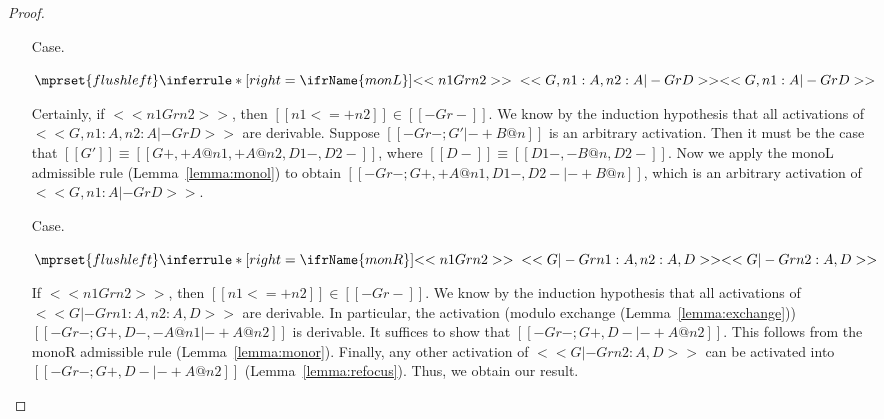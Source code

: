 \begin{proof}
\begin{itemize}
  \item[Case.]\ \\ 
    \begin{center}
      \begin{math}
        $$\mprset{flushleft}
        \inferrule* [right=\ifrName{monL}] {
          <<n1 Gr n2>>
          \\\\
          <<G , n1 : A , n2 : A |- Gr D>>
        }{<<G , n1 : A |- Gr D>>}
      \end{math}
    \end{center}
    Certainly, if $<<n1 Gr n2>>$, then $[[n1 <=+ n2]] \in [[-Gr-]]$.
    We know by the induction hypothesis that all activations of $<<G , n1 : A , n2 : A |- Gr D>>$ are
    derivable.  Suppose $[[-Gr- ; G' |- + B @ n]]$ is an arbitrary activation.  Then it must be the case
    that $[[G']] \equiv [[{G}+, +A@n1,+A@n2,{D1}-,{D2}-]]$, where $[[{D}-]] \equiv [[{D1}-,-B@n,{D2}-]]$.
    Now we apply the monoL admissible rule (Lemma~\ref{lemma:monol}) to obtain 
    $[[-Gr- ; {G}+, +A@n1,{D1}-,{D2}- |- + B @ n]]$, which is an arbitrary activation of 
    $<<G , n1 : A |- Gr D>>$.

  \item[Case.]\ \\ 
    \begin{center}
      \begin{math}
        $$\mprset{flushleft}
        \inferrule* [right=\ifrName{monR}] {
          <<n1 Gr n2>>
          \\\\
          <<G |- Gr n1 : A , n2 : A, D>>
        }{<<G |- Gr n2 : A, D>>}
      \end{math}
    \end{center}    
    If $<<n1 Gr n2>>$, then $[[n1 <=+ n2]] \in [[-Gr-]]$.  We know by the induction hypothesis that
    all activations of $<<G |- Gr n1 : A , n2 : A, D>>$ are derivable.  In particular, the activation
    (modulo exchange (Lemma~\ref{lemma:exchange})) $[[-Gr-; {G}+, {D}-, -A@n1 |- + A @ n2]]$ is
    derivable.  It suffices to show that $[[-Gr-; {G}+, {D}- |- + A @ n2]]$. This follows from
    the monoR admissible rule (Lemma~\ref{lemma:monor}).  Finally, any other activation of $<<G |- Gr n2 : A, D>>$
    can be activated into $[[-Gr-; {G}+, {D}- |- + A @ n2]]$ (Lemma~\ref{lemma:refocus}).  Thus,
    we obtain our result.
    

\end{itemize}
\end{proof}
